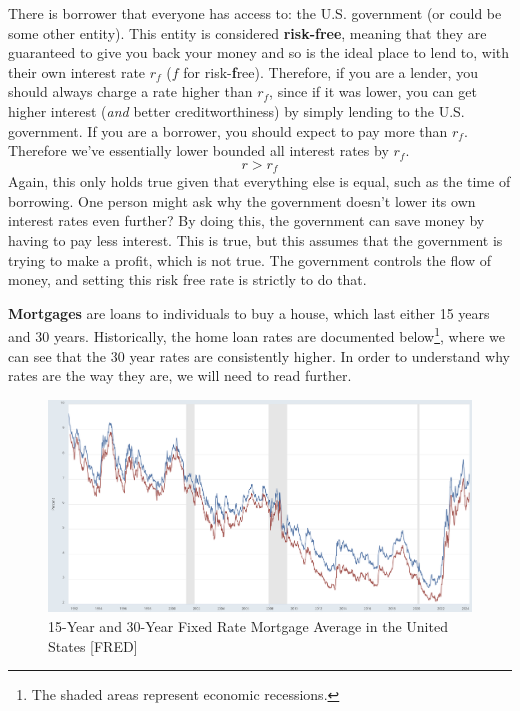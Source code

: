 \documentclass{article}
\begin{document}
    There is borrower that everyone has access to: the U.S. government (or could be some other entity). This entity is considered \textbf{risk-free}, meaning that they are guaranteed to give you back your money and so is the ideal place to lend to, with their own interest rate $r_f$ ($f$ for risk-\textbf{f}ree). Therefore, if you are a lender, you should always charge a rate higher than $r_f$, since if it was lower, you can get higher interest (\textit{and} better creditworthiness) by simply lending to the U.S. government. If you are a borrower, you should expect to pay more than $r_f$. Therefore we've essentially lower bounded all interest rates by $r_f$. 
    \begin{equation}
      r > r_f
    \end{equation}
    Again, this only holds true given that everything else is equal, such as the time of borrowing. One person might ask why the government doesn't lower its own interest rates even further? By doing this, the government can save money by having to pay less interest. This is true, but this assumes that the government is trying to make a profit, which is not true. The government controls the flow of money, and setting this risk free rate is strictly to do that. 

    \begin{example}
      \textbf{Mortgages} are loans to individuals to buy a house, which last either 15 years and 30 years. Historically, the home loan rates are documented below\footnote{The shaded areas represent economic recessions.}, where we can see that the 30 year rates are consistently higher. In order to understand why rates are the way they are, we will need to read further. 
      \begin{figure}[H]
        \centering 
        \includegraphics[scale=0.25]{img/mortgage.png}
        \caption{15-Year and 30-Year Fixed Rate Mortgage Average in the United States [FRED]} 
        \label{fig:mortgage}
      \end{figure}
    \end{example}
\end{document}
